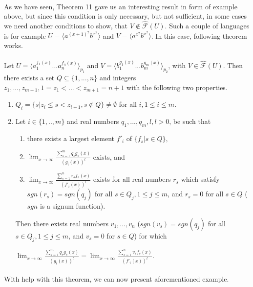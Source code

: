 \paragraph{}
As we have seen, Theorem 11 gave us an interesting result in form of example above, but since this condition is only necessary, but not sufficient, in some cases we need another conditions to show, that $V \notin \hat{\mathcal{F}}(U)$. Such a couple of languages is for example $U = \langle a^{(x+1)^{2}}b^{x^{2}}\rangle $ and $V = \langle a^{x^{2}}b^{x^{2}}\rangle $. In this case, following theorem works.

\paragraph{}
\cveta Let $U = \langle a_{1}^{f_{1}(x)}...a_{n}^{f_{n}(x)} \rangle_{p_{1}} $ and $V = \langle b_{1}^{g_{1}(x)}...b_{m}^{g_{m}(x)} \rangle_{p_{2}} $, with $V \in \hat{\mathcal{F}}(U) $. Then there exists a set $Q \subseteq \{ 1, ..., n \} $ and integers $z_{1}, ..., z_{m+1}, 1=z_{1} < ... < z_{m+1} = n+1 $ with the following two properties.
\begin{enumerate}
\item $Q_{i} = \{ s | z_{i} \leq s < z_{i+1}, s \notin Q \} \neq \emptyset $ for all $i, 1 \leq i \leq m$.
\item Let $i \in \{ 1, .., m\} $ and real numbers $q_{1}, ..., q_{m}, l, l >0$, be such that
\begin{enumerate}
\item there exists a largest element $f'_{i}$ of $\{ f_{s} | s \in Q \} $,
\item $\lim_{x\to \infty }\frac{\sum_{s=1}^{m}q_{s}g_{s}(x)}{(g_{i}(x))^{l}}$ exists, and
\item $\lim_{x\to \infty }\frac{\sum_{s=1}^{n}r_{s}f_{s}(x)}{(f'_{i}(x))^{l}}$ exists for all real numbers $r_{s}$ which satisfy $sgn(r_{s}) = sgn(q_{j})$ for all $s \in Q_{j}, 1 \leq j \leq m$, and $r_{s} = 0$ for all $s \in Q$ ($sgn$ is a signum function).
\end{enumerate}
Then there exists real numbers $v_{1},...,v_{n}$ ($sgn(v_{s}) = sgn(q_{j})$ for all $s \in Q_{j}, 1 \leq j \leq m$, and $v_{s} = 0$ for $s\in Q$) for which \\
\centerline{$\lim_{x\to \infty }\frac{\sum_{s=1}^{m}q_{s}g_{s}(x)}{(g_{i}(x))^{l}} = \lim_{x\to \infty }\frac{\sum_{s=1}^{n}v_{s}f_{s}(x)}{(f'_{i}(x))^{l}}$.}
\end{enumerate} 

\paragraph{}
With help with this theorem, we can now present aforementioned example.

